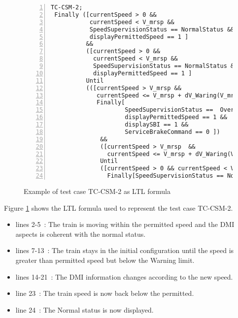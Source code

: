 \begin{figure}
\begin{Verbatim}[numbers=left]
TC-CSM-2;
 Finally ([currentSpeed > 0 && 
           currentSpeed < V_mrsp &&
           SpeedSupervisionStatus == NormalStatus && 
           displayPermittedSpeed == 1 ]
          &&
          ([currentSpeed > 0 && 
            currentSpeed < V_mrsp &&
            SpeedSupervisionStatus == NormalStatus && 
            displayPermittedSpeed == 1 ]
          Until
          (([currentSpeed > V_mrsp && 
             currentSpeed <= V_mrsp + dV_Waring(V_mrsp)]  && 
             Finally[
                     SpeedSupervisionStatus ==  OverspeedStatus && 
                     displayPermittedSpeed == 1 && 
                     displaySBI == 1 && 
                     ServiceBrakeCommand == 0 ])
              &&
              ([currentSpeed > V_mrsp  && 
                currentSpeed <= V_mrsp + dV_Waring(V_mrsp) ]   
              Until
              ([currentSpeed > 0 && currentSpeed < V_mrsp ] &&
                Finally[SpeedSupervisionStatus == NormalStatus ])))));

\end{Verbatim}
\caption{Example of test case TC-CSM-2 as LTL formula\label{fig:testltlex}}
\end{figure}

Figure \ref{fig:testltlex} shows the LTL formula used to represent the
test case TC-CSM-2. 
\begin{itemize}
\item lines 2-5~: The train is moving within the permitted speed and
the DMI aspects is coherent with the normal status.
\item lines 7-13~: The train stays in the initial configuration until
the speed is greater than permitted speed but below the Warning limit.
\item lines 14-21~: The DMI information changes according to the new
speed.
\item line 23~: The train speed is now back below the permitted.
\item line 24~: The Normal status is now displayed.
\end{itemize}



